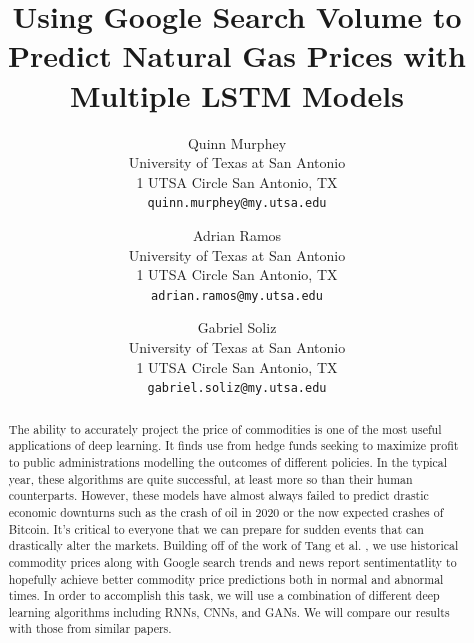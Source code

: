 \documentclass[final]{cvpr}
\begin{document}
\title{Using Google Search Volume to Predict Natural Gas Prices with Multiple LSTM Models}


\author{Quinn Murphey\\
University of Texas at San Antonio\\
1 UTSA Circle San Antonio, TX\\
{\tt\small quinn.murphey@my.utsa.edu}
\and
Adrian Ramos\\
University of Texas at San Antonio\\
1 UTSA Circle San Antonio, TX\\
{\tt\small adrian.ramos@my.utsa.edu}

\and
Gabriel Soliz\\
University of Texas at San Antonio\\
1 UTSA Circle San Antonio, TX\\
{\tt\small gabriel.soliz@my.utsa.edu}
}

\maketitle


\begin{abstract}
    The ability to accurately project the price of commodities is one of the
    most useful applications of deep learning. It finds use from hedge funds
    seeking to maximize profit to public administrations modelling the outcomes
    of different policies. In the typical year, these algorithms are quite 
    successful, at least more so than their human counterparts. However, these
    models have almost always failed to predict drastic economic downturns such
    as the crash of oil in 2020 or the now expected crashes of Bitcoin.
    It’s critical to everyone that we can prepare for sudden events that can
    drastically alter the markets. Building off of the work of Tang et al.
    \cite{tang}, we use historical commodity prices along with Google
    search trends and news report sentimentatlity to hopefully achieve better
    commodity price predictions both in normal and abnormal times. In order
    to accomplish this task, we will use a combination of different deep
    learning algorithms including RNNs, CNNs, and GANs. We will compare our
    results with those from similar papers.
\end{abstract}
\end{document}
